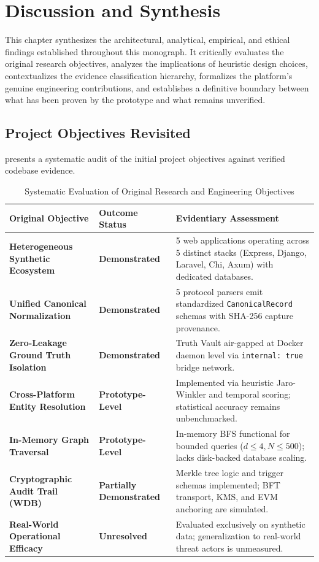 \chapter{Discussion and Synthesis}
\label{ch:discussion}

This chapter synthesizes the architectural, analytical, empirical, and ethical findings established throughout this monograph. It critically evaluates the original research objectives, analyzes the implications of heuristic design choices, contextualizes the evidence classification hierarchy, formalizes the platform's genuine engineering contributions, and establishes a definitive boundary between what has been proven by the prototype and what remains unverified.

\section{Project Objectives Revisited}
\label{sec:disc-objectives}
 presents a systematic audit of the initial project objectives against verified codebase evidence.

\begin{table}[htbp]
\centering
\small
\caption{Systematic Evaluation of Original Research and Engineering Objectives}
\label{tab:objective-assessment}
\begin{tabular}{@{}p{4.5cm}p{2.8cm}p{6.5cm}@{}}
\toprule
\textbf{Original Objective} & \textbf{Outcome Status} & \textbf{Evidentiary Assessment} \\ \midrule
\textbf{Heterogeneous Synthetic Ecosystem} & \textbf{Demonstrated} & 5 web applications operating across 5 distinct stacks (Express, Django, Laravel, Chi, Axum) with dedicated databases. \\ \addlinespace
\textbf{Unified Canonical Normalization} & \textbf{Demonstrated} & 5 protocol parsers emit standardized \texttt{CanonicalRecord} schemas with SHA-256 capture provenance. \\ \addlinespace
\textbf{Zero-Leakage Ground Truth Isolation} & \textbf{Demonstrated} & Truth Vault air-gapped at Docker daemon level via \texttt{internal: true} bridge network. \\ \addlinespace
\textbf{Cross-Platform Entity Resolution} & \textbf{Prototype-Level} & Implemented via heuristic Jaro-Winkler and temporal scoring; statistical accuracy remains unbenchmarked. \\ \addlinespace
\textbf{In-Memory Graph Traversal} & \textbf{Prototype-Level} & In-memory BFS functional for bounded queries ($d \le 4, N \le 500$); lacks disk-backed database scaling. \\ \addlinespace
\textbf{Cryptographic Audit Trail (WDB)} & \textbf{Partially Demonstrated} & Merkle tree logic and trigger schemas implemented; BFT transport, KMS, and EVM anchoring are simulated. \\ \addlinespace
\textbf{Real-World Operational Efficacy} & \textbf{Unresolved} & Evaluated exclusively on synthetic data; generalization to real-world threat actors is unmeasured. \\ \bottomrule
\end{tabular}
\end{table}

